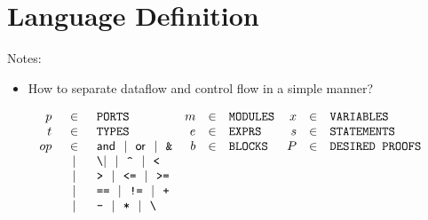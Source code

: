\documentclass[10pt]{article}
\newcommand{\alt}{~~|~~}
\newcommand{\andop}        {\mathsf{and}}
\newcommand{\orop}         {\mathsf{or}}
\begin{document}
\section{Language Definition}

Notes:
\begin{itemize}
	\item How to separate dataflow and control flow in a simple manner?
\end{itemize}

\[
	\begin{array}{rclrclrcl}
		p  & \in  & \verb|PORTS|                           & m & \in & \verb|MODULES| & x & \in & \verb|VARIABLES|      \\
		t  & \in  & \verb|TYPES|                           & e & \in & \verb|EXPRS|   & s & \in & \verb|STATEMENTS|     \\
		op & \in  & \andop \alt \orop \alt \verb|&|        & b & \in & \verb|BLOCKS|  & P & \in & \verb|DESIRED PROOFS| \\
		   & \alt & \verb|\|| \alt \verb|^| \alt \verb|<|  &   &     &                &   &                             \\
		   & \alt & \verb|>| \alt \verb|<=| \alt \verb|>=| &   &     &                &   &                             \\
		   & \alt & \verb|==| \alt \verb|!=| \alt \verb|+| &   &     &                &   &                             \\
		   & \alt & \verb|-| \alt \verb|*|  \alt \verb|\|  &   &     &                &   &                             \\
	\end{array}
\]
\end{document}
